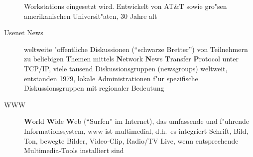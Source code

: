 \documentclass[12pt,titlepage,twoside]{scrartcl}
\begin{document}
\begin{appendix}
\begin{description}
    Workstations eingesetzt wird. Entwickelt von AT\&T sowie gro"sen
    amerikanischen Universit"aten, 30 Jahre alt
  \item[Usenet News] weltweite "offentliche Diskussionen ("`schwarze Bretter"')
    von Teilnehmern zu beliebigen Themen mittels \textbf{N}etwork
    \textbf{N}ews \textbf{T}ransfer \textbf{P}rotocol unter TCP/IP, viele
    tausend Diskussionsgruppen (newsgroups) weltweit, entstanden 1979, lokale
    Administrationen f"ur spezifische Diskussionsgruppen mit regionaler
    Bedeutung
  \item[WWW] \textbf{W}orld \textbf{W}ide \textbf{W}eb ("`Surfen"' im
    Internet), das umfassende und f"uhrende Informationssystem, www ist
    multimedial, d.h.\  es integriert Schrift, Bild, Ton, bewegte Bilder,
    Video-Clip, Radio/TV Live, wenn entsprechende Multimedia-Tools installiert
    sind
\end{description}

\end{appendix}
\end{document}
